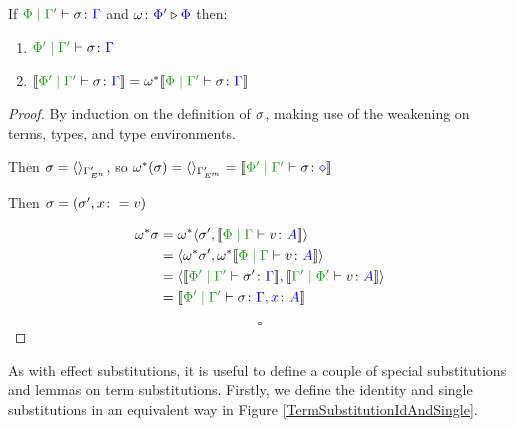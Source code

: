 \documentclass{Report}
\begin{document}
\begin{framed}
    \begin{theorem}\label{EffectWeakeningOnTermSubstitution}
        If $\etyperelation{\P}{\G'}{\si}{\G}$ and $\omega \colon {\color{blue}\Phi'} \triangleright {\color {blue} \Phi}$ then:
        
        \begin{enumerate}[label=\roman*.]
            \item $\etyperelation{\P'}{\G'}{\si}{\G}$
            \item $\deno{\etyperelation{\P'}{\G'}{\si}{\G}} = \w\star\deno{\etyperelation{\P}{\G'}{\si}{\G}}$
        \end{enumerate}
    \end{theorem}
    
    
    \begin{proof}
        By induction on the definition of $\sigma$, making use of the weakening on terms, types, and type environments.
    
        \case{\tsubnil}
        Then $\sigma = \langle\rangle_{\Gamma'_{E^n}}$, so $\w\star(\si) = \term{\G'_{E^m}} = \deno{\etyperelation{\P'}{\G'}{\si}{\nil}}$
        
        \case{\tsubextend}
        Then $\sigma = (\sigma',x\colon= v)$
        
        \begin{align*}
            \w\star\si & = \w\star\pr{\si'}{\deno{\gpetyperelation{v}{A}}}\\
            & = \pr{\w\star\si'}{\w\star\deno{\gpetyperelation{v}{A}}}\\
            &=\pr{\deno{\etyperelation{\P'}{\G'}{\si'}{\G}}}{\deno{\etyperelation{\G'}{\P'}{v}{A}}}\\
            &=\deno{\etyperelation{\P'}{\G'}{\si}{\gax}}
        \end{align*}
    
        $$\square$$
    
    \end{proof}
\end{framed}

As with effect substitutions, it is useful to define a couple of special substitutions and lemmas on term substitutions. Firstly, we define the identity and single substitutions in an equivalent way in Figure \ref{TermSubstitutionIdAndSingle}.
\end{document}
